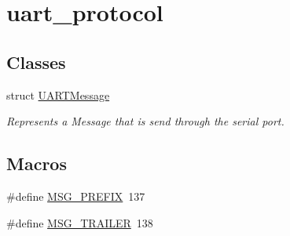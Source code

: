 \hypertarget{group__uart__protocol}{}\section{uart\+\_\+protocol}
\label{group__uart__protocol}
\subsection*{Classes}
\begin{DoxyCompactItemize}
\item 
struct \mbox{\hyperlink{struct_u_a_r_t_message}{U\+A\+R\+T\+Message}}
\begin{DoxyCompactList}\small\item\em Represents a Message that is send through the serial port. \end{DoxyCompactList}\end{DoxyCompactItemize}
\subsection*{Macros}
\begin{DoxyCompactItemize}
\item 
\#define \mbox{\hyperlink{group__uart__protocol_ga155260c75bcf6f1b9ff00fac4ad1cc48}{M\+S\+G\+\_\+\+P\+R\+E\+F\+IX}}~137
\item 
\#define \mbox{\hyperlink{group__uart__protocol_ga115462df9e5caa853c7d8f33f89cbba6}{M\+S\+G\+\_\+\+T\+R\+A\+I\+L\+ER}}~138
\end{DoxyCompactItemize}
